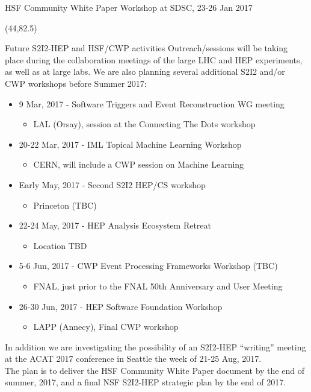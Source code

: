 \documentclass[final]{beamer}
\begin{document}
\begin{frame}{}
\begin{textblock}{38.0}
\begin{block}{HSF Community White Paper Workshop at SDSC, 23-26 Jan 2017}
\begin{textblock}{38.0}(44,82.5)
\begin{block}{Future S2I2-HEP and HSF/CWP activities}
Outreach/sessions will be taking place during the collaboration meetings
of the large LHC and HEP experiments, as well as at large labs. We are also 
planning several additional S2I2 and/or CWP workshops before 
Summer 2017: \\
\begin{itemize}
\item 9 Mar, 2017 - Software Triggers and Event Reconstruction WG meeting
    \begin{itemize}
    \item LAL (Orsay), session at the Connecting The Dots workshop 
    \end{itemize}
\item 20-22 Mar, 2017 - IML Topical Machine Learning Workshop
    \begin{itemize}
    \item CERN, will include a CWP session on Machine Learning
    \end{itemize}
\item Early May, 2017 - Second S2I2 HEP/CS workshop
    \begin{itemize}
    \item Princeton (TBC)
    \end{itemize}
\item 22-24 May, 2017 - HEP Analysis Ecosystem Retreat
    \begin{itemize}
    \item Location TBD
    \end{itemize}
\item 5-6 Jun, 2017 - CWP Event Processing Frameworks Workshop (TBC)
    \begin{itemize}
    \item FNAL, just prior to the FNAL 50th Anniversary and User Meeting
    \end{itemize}
\item 26-30 Jun, 2017 - HEP Software Foundation Workshop
    \begin{itemize}
    \item LAPP (Annecy), Final CWP workshop
    \end{itemize}
\end{itemize}
In addition we are investigating the possibility of an S2I2-HEP ``writing'' meeting at the ACAT 2017 conference in Seattle the week of 21-25 Aug, 2017.
~~~ \\
The plan is to deliver the HSF Community White Paper document by the end of summer, 2017, and a final NSF S2I2-HEP strategic plan by the end of 2017.
\end{block}
\end{textblock}




\end{block}
\end{textblock}
\end{frame}
\end{document}

